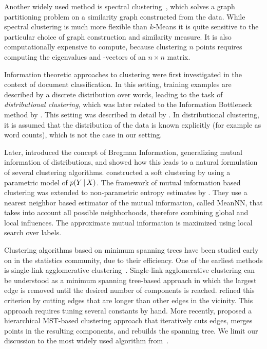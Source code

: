 Another widely used method is spectral clustering~\citep{shi2000normalized,ng2002spectral}, 
which solves a graph partitioning problem on a similarity
graph constructed from the data. While spectral clustering is much more
flexible than $k$-Means it is quite sensitive to the particular choice of graph
construction and similarity measure. It is also computationally expensive to
compute, because clustering $n$ points requires computing the eigenvalues and
-vectors of an $n{\times}n$ matrix.

Information theoretic approaches to clustering were first investigated in the
context of document classification. In this setting, training examples are
described by a discrete distribution over words, leading to the task of
\emph{distributional clustering}, which was later related to the Information
Bottleneck method by \citep{slonim1999agglomerative}.
This setting was described in detail by \citep{dhillon2003divisive}. In
distributional clustering, it is assumed that the distribution of the data is
known explicitly (for example as word counts), which is not the case in our
setting.

Later, \citet{banerjee2005clustering} introduced the concept of Bregman
Information, generalizing mutual information of distributions, and showed how
this leads to a natural formulation of several clustering algorithms.
%
\citet{barber2006kernelized} constructed a soft clustering by using a parametric model of $p(Y\, | \, X)$.
%
The framework of mutual information based clustering was extended to
non-parametric entropy estimates by \citet{faivishevsky2010nonparametric}.
They use a nearest neighbor based estimator of the mutual information, called
MeanNN, that takes into account all possible neighborhoods, therefore combining
global and local influences. The approximate mutual information is maximized
using local search over labels.

Clustering algorithms based on minimum spanning trees have been studied early
on in the statistics community, due to their efficiency.  One of the earliest
methods is single-link agglomerative clustering~\citep{gower1969minimum}.
Single-link agglomerative clustering can be understood as a minimum spanning
tree-based approach in which the largest edge is removed until the desired
number of components is reached.  \citet{zahn1971graph} refined this criterion
by cutting edges that are longer than other edges in the vicinity. This
approach requires tuning several constants by hand. More recently,
\citet{grygorash2006minimum} proposed a hierarchical MST-based clustering
approach that iteratively cuts edges, merges points in the resulting
components, and rebuilds the spanning tree.
We limit our discussion to the most widely used algorithm from~\citep{gower1969minimum}.
%
